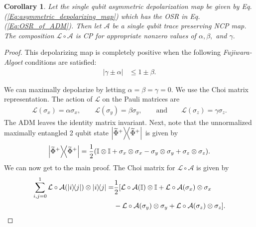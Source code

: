 \documentclass[12pt]{iopart}
\newtheorem{corollary}{Corollary}
\begin{document}
\begin{corollary}
Let the single qubit asymmetric depolarization map be given by Eq. (\ref{Eq:asymmetric_depolarizing_map}) which has the OSR in Eq. (\ref{Eq:OSR_of_ADM}). Then let $\mathcal{A}$ be a single qubit trace preserving NCP map. The composition $\mathcal{L}\circ\mathcal{A}$ is CP for appropriate nonzero values of $\alpha, \beta,$ and $\gamma.$
\end{corollary}
\begin{proof}
This depolarizing map is completely positive when the following \textit{Fujiwara-Algoet} \cite{Fujiwara_1999OneToOneParamOfQuantChannels} conditions are satisfied:
\begin{align}
    |\gamma \pm \alpha| &\leq 1 \pm \beta.
\end{align}
\begin{comment}
\begin{align}
    -(1-\beta) &\leq \gamma - \alpha \leq 1-\beta \\
    -(1+\beta) &\leq \gamma + \alpha \leq 1+\beta.
\end{align}
\end{comment}
We can maximally depolarize by letting $\alpha=\beta=\gamma=0$. We use the Choi matrix representation. The action of $\mathcal{L}$ on the Pauli matrices are
    \begin{align}\label{eq:singleAsymmPauli}
        \mathcal{L}(\sigma_x)=\alpha\sigma_x,\qquad \mathcal{L}(\sigma_y)=\beta\sigma_y, \qquad\text{and}\qquad \mathcal{L}(\sigma_z)=\gamma\sigma_z.
    \end{align}
    The ADM leaves the identity matrix invariant. Next, note that the unnormalized maximally entangled 2 qubit state $\op{\widetilde{\Phi}^+}$ is given by
    \begin{align}
        \op{\widetilde{\Phi}^+}=\dfrac{1}{2}(\mathbb{I}\otimes\mathbb{I}+\sigma_x\otimes\sigma_x-\sigma_y\otimes\sigma_y+\sigma_z\otimes\sigma_z).
    \end{align}
    We can now get to the main proof. The Choi matrix for $\mathcal{L}\circ\mathcal{A}$ is given by
    \begin{align}\label{eq:2qubitComp}
        \notag\sum_{i,j=0}^1\mathcal{L}\circ\mathcal{A}(\op{i}{j})\otimes\op{i}{j}=&\dfrac{1}{2}[\mathcal{L}\circ\mathcal{A}(\mathbb{I})\otimes\mathbb{I}+\mathcal{L}\circ\mathcal{A}(\sigma_x)\otimes\sigma_x\\
        &-\mathcal{L}\circ\mathcal{A}(\sigma_y)\otimes\sigma_y+\mathcal{L}\circ\mathcal{A}(\sigma_z)\otimes\sigma_z].
    \end{align}

\end{proof}
\end{document}
